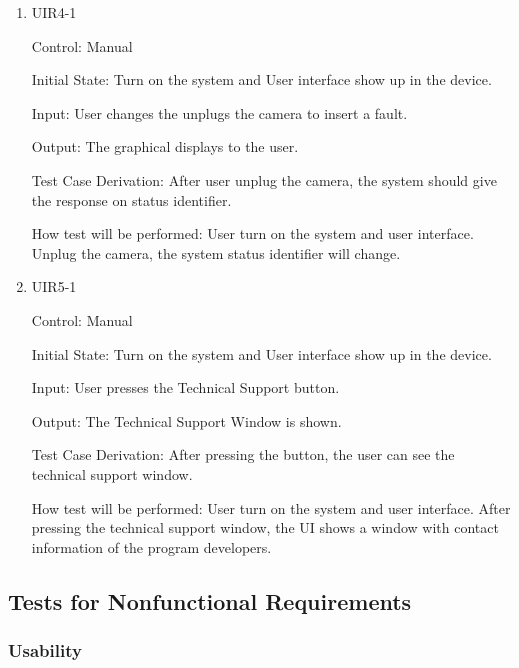 \documentclass[12pt, titlepage]{article}
\begin{document}
\begin{enumerate}
\item{UIR4-1\\}

Control: Manual
					
Initial State: Turn on the system and User interface show up in the device.
					
Input: User changes the unplugs the camera to insert a fault.
					
Output: The graphical displays to the user.

Test Case Derivation: After user unplug the camera, the system should give the response on status identifier.
					
How test will be performed: User turn on the system and user interface. Unplug the camera, the system status identifier will change.

\item{UIR5-1\\}

Control: Manual
					
Initial State: Turn on the system and User interface show up in the device.
					
Input: User presses the Technical Support button.
					
Output: The Technical Support Window is shown.

Test Case Derivation: After pressing the button, the user can see the technical support window.
					
How test will be performed: 
User turn on the system and user interface. After pressing the technical support window, the UI shows a window  with contact information of the program developers. 

\end{enumerate}

\subsection{Tests for Nonfunctional Requirements}




\subsubsection{Usability}
		
\end{document}

